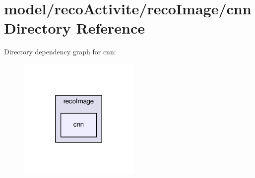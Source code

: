 \section{model/reco\+Activite/reco\+Image/cnn Directory Reference}
\label{dir_4a9036867757a8162e591dc86fc3a991}
Directory dependency graph for cnn\+:
\nopagebreak
\begin{figure}[H]
\begin{center}
\leavevmode
\includegraphics[width=166pt]{dir_4a9036867757a8162e591dc86fc3a991_dep}
\end{center}
\end{figure}

